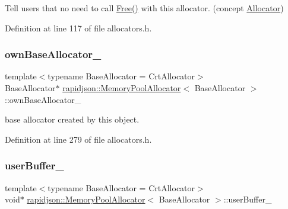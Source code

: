 Tell users that no need to call \mbox{\hyperlink{classrapidjson_1_1_memory_pool_allocator_a9470dfeaeef3b3775249df2223129a2b}{Free()}} with this allocator. (concept \mbox{\hyperlink{classrapidjson_1_1_allocator}{Allocator}}) 



Definition at line 117 of file allocators.\+h.

\mbox{\label{classrapidjson_1_1_memory_pool_allocator_afc4427c123458c4a2b5a03319e038788}} 
\subsubsection{\texorpdfstring{ownBaseAllocator\_}{ownBaseAllocator\_}}
{\footnotesize\ttfamily template$<$typename Base\+Allocator = Crt\+Allocator$>$ \\
Base\+Allocator$\ast$ \mbox{\hyperlink{classrapidjson_1_1_memory_pool_allocator}{rapidjson\+::\+Memory\+Pool\+Allocator}}$<$ Base\+Allocator $>$\+::own\+Base\+Allocator\+\_\+\hspace{0.3cm}{\ttfamily [private]}}



base allocator created by this object. 



Definition at line 279 of file allocators.\+h.

\mbox{\label{classrapidjson_1_1_memory_pool_allocator_a3d705851c08a78cbf6ab35d9bcdef010}} 
\subsubsection{\texorpdfstring{userBuffer\_}{userBuffer\_}}
{\footnotesize\ttfamily template$<$typename Base\+Allocator = Crt\+Allocator$>$ \\
void$\ast$ \mbox{\hyperlink{classrapidjson_1_1_memory_pool_allocator}{rapidjson\+::\+Memory\+Pool\+Allocator}}$<$ Base\+Allocator $>$\+::user\+Buffer\+\_\+\hspace{0.3cm}{\ttfamily [private]}}



